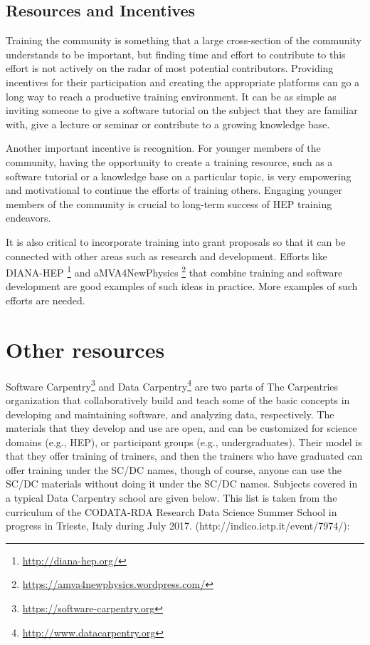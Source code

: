 \documentclass[12pt,a4paper]{article}
\begin{document}
\subsection{Resources and Incentives}

Training the community is something that a large cross-section of the community
understands to be important, but finding time and effort to contribute to this
effort is not actively on the radar of most potential contributors. Providing
incentives for their participation and creating the appropriate platforms can go
a long way to reach a productive training environment. It can be as simple as
inviting someone to give a software tutorial on the subject that they are
familiar with, give a lecture or seminar or contribute to a growing knowledge
base.

Another important incentive is recognition. For younger members of the
community, having the opportunity to create a training resource, such as a
software tutorial or a knowledge base on a particular topic, is very empowering
and motivational to continue the efforts of training others. Engaging younger
members of the community is crucial to long-term success of HEP training
endeavors.

It is also critical to incorporate training into grant proposals so that it can
be connected with other areas such as research and development. Efforts like
DIANA-HEP \footnote{\url{http://diana-hep.org/}} and aMVA4NewPhysics
\footnote{\url{https://amva4newphysics.wordpress.com/}} that combine training
and software development are good examples of such ideas in practice. More
examples of such efforts are needed.


\section{Other resources}

Software Carpentry\footnote{\url{https://software-carpentry.org}} and Data
Carpentry\footnote{\url{http://www.datacarpentry.org}} are two parts of The
Carpentries organization that collaboratively build and teach some of the basic
concepts in developing and maintaining software, and analyzing data,
respectively.  The materials that they develop and use are open, and can be
customized for science domains (e.g., HEP), or participant groups (e.g.,
undergraduates). Their model is that they offer training of trainers, and then
the trainers who have graduated can offer training under the SC/DC names, though
of course, anyone can use the SC/DC materials without doing it under the SC/DC
names.
Subjects covered in a typical Data Carpentry school are given below. This list
is taken from the curriculum of the CODATA-RDA Research Data Science Summer
School in progress in Trieste, Italy during July 2017.
(http://indico.ictp.it/event/7974/):
\end{document}
